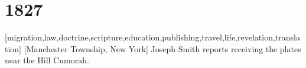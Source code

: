 \section{1827} %



	[migration,law,doctrine,scripture,education,publishing,travel,life,revelation,translation]
	[Manchester Township, New York]
	{Joseph Smith reports receiving the plates near the Hill Cumorah.}
	







